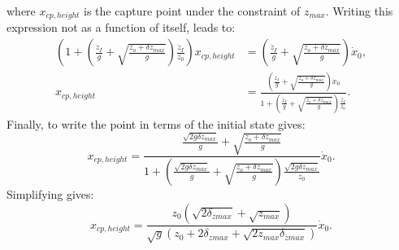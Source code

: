where $x_{cp,height}$ is the capture point under the constraint of $z_{max}$. Writing this expression not as a function of itself, leads to:
\begin{align}
	 (1+(\frac{\dot{z}_I}{g}+\sqrt{\frac{z_o+\delta z_{max}}{g}})\frac{\dot{z}_I}{z_0})x_{cp,height}& =		(\frac{\dot{z}_I}{g}+\sqrt{\frac{z_o+\delta z_{max}}{g}})\dot{x}_0,\\
	 x_{cp,height} & = \frac{(\frac{\dot{z}_I}{g}+\sqrt{\frac{z_o+\delta z_{max}}{g}})\dot{x}_0}{ 1+(\frac{\dot{z}_I}{g}+\sqrt{\frac{z_o+\delta z_{max}}{g}})\frac{\dot{z}_I}{z_0}}.
\end{align}
Finally, to write the point in terms of the initial state gives:
\begin{equation}
 x_{cp,height}  = \frac{\frac{\sqrt{2g\delta z_{max}}}{g}+\sqrt{\frac{z_o+\delta z_{max}}{g}}}{ 1+(\frac{\sqrt{2g\delta z_{max}}}{g}+\sqrt{\frac{z_o+\delta z_{max}}{g}})\frac{\sqrt{2g\delta z_{max}}}{z_0}}\dot{x}_0.
\end{equation}
Simplifying gives:
\begin{equation}
	 x_{cp,height} = \frac{z_0(\sqrt{2\delta_{zmax}}+\sqrt{z_{max}})}{\sqrt{g}(z_0 + 2\delta_{zmax} + \sqrt{2z_{max}\delta_{zmax}})}\dot{x}_0.
\end{equation}

